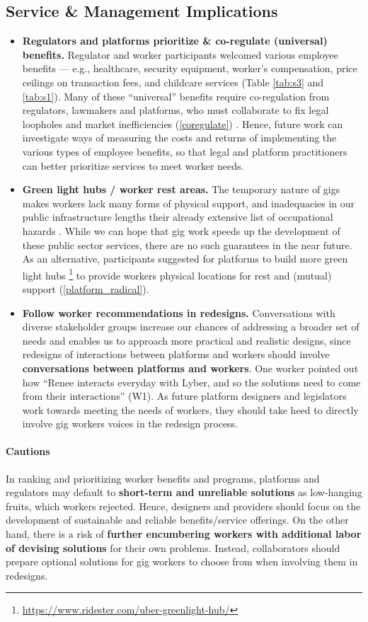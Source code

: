 \subsection{Service \& Management Implications}
\begin{itemize}
    \item \textbf{Regulators and platforms prioritize \& co-regulate (universal) benefits.} Regulator and worker participants welcomed various employee benefits --- e.g., healthcare, security equipment, worker's compensation, price ceilings on transaction fees, and childcare services (Table \ref{tab:s3} and \ref{tab:s1}). Many of these ``universal'' benefits require co-regulation from regulators, lawmakers and platforms, who must collaborate to fix legal loopholes and market inefficiencies (\ref{coregulate}) \cite{cannon2014framework}. Hence, future work can investigate ways of measuring the costs and returns of implementing the various types of employee benefits, so that legal and platform practitioners can better prioritize services to meet worker needs.
    \item \textbf{Green light hubs / worker rest areas. }The temporary nature of gigs makes workers lack many forms of physical support, and inadequacies in our public infrastructure lengths their already extensive list of occupational hazards \cite{xMHW}. While we can hope that gig work speeds up the development of these public sector services, there are no such guarantees in the near future. As an alternative, participants suggested for platforms to build more green light hubs \footnote{\url{https://www.ridester.com/uber-greenlight-hub/}} to provide workers physical locations for rest and (mutual) support (\ref{platform_radical}).
    \item \textbf{Follow worker recommendations in redesigns.} Conversations with diverse stakeholder groups increase our chances of addressing a broader set of needs and enables us to approach more practical and realistic designs, since redesigns of interactions between platforms and workers should involve \textbf{conversations between platforms and workers}. One worker pointed out how ``Renee interacts everyday with Lyber, and so the solutions need to come from their interactions'' (W1). As future platform designers and legislators work towards meeting the needs of workers, they should take heed to directly involve gig workers voices in the redesign process.

\end{itemize}

\paragraph{Cautions}
In ranking and prioritizing worker benefits and programs, platforms and regulators may default to \textbf{short-term and unreliable solutions} as low-hanging fruits, which workers rejected. Hence, designers and providers should focus on the development of sustainable and reliable benefits/service offerings. 
On the other hand, there is a risk of \textbf{further encumbering workers with additional labor of devising solutions} for their own problems. Instead, collaborators should prepare optional solutions for gig workers to choose from when involving them in redesigns.
